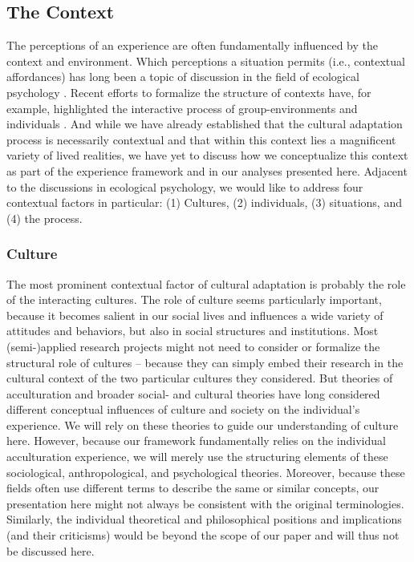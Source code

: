 \documentclass[man, 12pt, a4paper]{apa7}
\begin{document}
\subsection{The Context}
The perceptions of an experience are often fundamentally influenced by the context and environment. Which perceptions a situation permits (i.e., contextual affordances) has long been a topic of discussion in the field of ecological psychology \citep[e.g.,][]{Cantor1994}. Recent efforts to formalize the structure of contexts have, for example, highlighted the interactive process of group-environments and individuals \citep[e.g.,][]{Young2002}.
And while we have already established that the cultural adaptation process is necessarily contextual and that within this context lies a magnificent variety of lived realities, we have yet to discuss how we conceptualize this context as part of the experience framework and in our analyses presented here. 
Adjacent to the discussions in ecological psychology, we would like to address four contextual factors in particular: (1) Cultures, (2) individuals, (3) situations, and (4) the process.

\subsubsection{Culture} 
The most prominent contextual factor of cultural adaptation is probably the role of the interacting cultures. The role of culture seems particularly important, because it becomes salient in our social lives and influences a wide variety of attitudes and behaviors, but also in social structures and institutions. 
Most (semi-)applied research projects might not need to consider or formalize the structural role of cultures -- because they can simply embed their research in the cultural context of the two particular cultures they considered.
But theories of acculturation and broader social- and cultural theories have long considered different conceptual influences of culture and society on the individual's experience. We will rely on these theories to guide our understanding of culture here. However, because our framework fundamentally relies on the individual acculturation experience, we will merely use the structuring elements of these sociological, anthropological, and psychological theories. Moreover, because these fields often use different terms to describe the same or similar concepts, our presentation here might not always be consistent with the original terminologies. Similarly, the individual theoretical and philosophical positions and implications (and their criticisms) would be beyond the scope of our paper and will thus not be discussed here.
\end{document}
